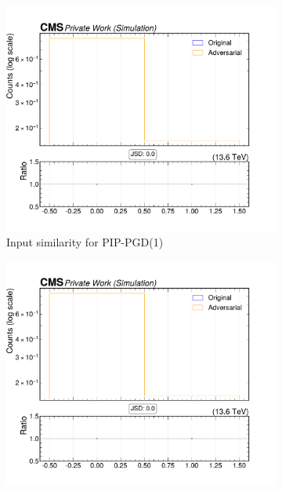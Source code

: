 \begin{figure}[htbp]
  \centering
  \begin{subfigure}[t]{0.32\textwidth}
    \includegraphics[width=\linewidth]{media/output/features/compare/combined_it_1/cmp_npf_arr_Npfcan_puppiw.pdf}
    \caption*{Input similarity for PIP-PGD(1)}
  \end{subfigure}\hfill
  \begin{subfigure}[t]{0.32\textwidth}
    \includegraphics[width=\linewidth]{media/output/features/compare/combined_it_2/cmp_npf_arr_Npfcan_puppiw.pdf}

\end{subfigure}
\end{figure}
